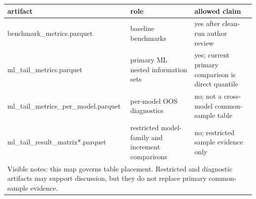 \begin{tabular}{lll}
\toprule
artifact & role & allowed claim \\
\midrule
benchmark\_metrics.parquet & baseline benchmarks & yes after clean-run author review \\
ml\_tail\_metrics.parquet & primary ML nested information sets & yes; current primary comparison is direct quantile \\
ml\_tail\_metrics\_per\_model.parquet & per-model OOS diagnostics & no; not a cross-model common-sample table \\
ml\_tail\_result\_matrix*.parquet & restricted model-family and increment comparisons & no; restricted sample evidence only \\
\midrule
\multicolumn{3}{l}{\footnotesize Visible notes: this map governs table placement. Restricted and diagnostic artifacts may support discussion, but they do not replace primary common-sample evidence.} \\
\bottomrule
\end{tabular}
